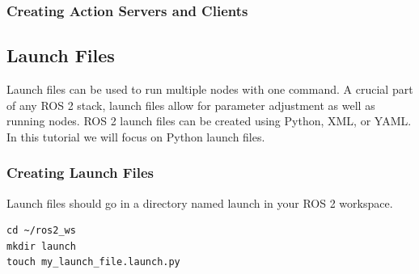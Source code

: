 \documentclass[11pt]{article}
\begin{document}
\subsubsection{Creating Action Servers and Clients}


\subsection{Launch Files}
Launch files can be used to run multiple nodes with one command. A crucial part of any ROS 2 stack, launch files allow for parameter adjustment as well as running nodes. ROS 2 launch files can be created using Python, XML, or YAML. In this tutorial we will focus on Python launch files.\\
\subsubsection{Creating Launch Files}
Launch files should go in a directory named launch in your ROS 2 workspace. 
\lstset{language=bash}
\begin{lstlisting}
cd ~/ros2_ws
mkdir launch
touch my_launch_file.launch.py
\end{lstlisting}
\pagebreak
\end{document}
